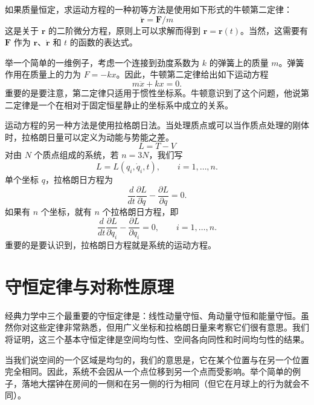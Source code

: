 如果质量恒定，求运动方程的一种初等方法是使用如下形式的牛顿第二定律：
\begin{equation}\label{eq:1.newton}
\ddot{\mathbf{r}} = \mathbf{F}/m
\end{equation}
这是关于 $\mathbf{r}$ 的二阶微分方程，原则上可以求解而得到 $\mathbf{r} = \mathbf{r}(t)$。当然，这需要有 $\mathbf{F}$ 作为 $\mathbf{r}$、$\dot{\mathbf{r}}$ 和 $t$ 的函数的表达式。

举一个简单的一维例子，考虑一个连接到劲度系数为 $k$ 的弹簧上的质量 $m$。弹簧作用在质量上的力为 $F = -kx$。因此，牛顿第二定律给出如下运动方程
\begin{equation}\label{eq:1.spring}
m\ddot{x} + kx = 0.
\end{equation}
重要的是要注意，第二定律只适用于惯性坐标系。牛顿意识到了这个问题，他说第二定律是一个在相对于固定恒星静止的坐标系中成立的关系。

运动方程的另一种方法是使用拉格朗日法。当处理质点或可以当作质点处理的刚体时，拉格朗日量可以定义为动能与势能之差。
\begin{equation}\label{eq:1.LTV}
L = T - V
\end{equation}
对由 $N$ 个质点组成的系统，若 $n = 3N$，我们写
\begin{equation}\label{eq:1.L}
L = L(q_i, \dot{q}_i, t), \qquad i = 1, \ldots, n.
\end{equation}
单个坐标 $q$，拉格朗日方程为
\begin{equation}\label{eq:1.lag}
\frac{d}{dt}\frac{\partial L}{\partial \dot{q}} - \frac{\partial L}{\partial q} = 0.
\end{equation}
如果有 $n$ 个坐标，就有 $n$ 个拉格朗日方程，即
\begin{equation}\label{eq:1.lagN}
\frac{d}{dt}\frac{\partial L}{\partial \dot{q}_i} - \frac{\partial L}{\partial q_i} = 0, \qquad i = 1, \ldots, n.
\end{equation}
重要的是要认识到，拉格朗日方程就是系统的运动方程。

\section{守恒定律与对称性原理}
经典力学中三个最重要的守恒定律是：线性动量守恒、角动量守恒和能量守恒。虽然你对这些定律非常熟悉，但用广义坐标和拉格朗日量来考察它们很有意思。我们将证明，这三个基本守恒定律是空间均匀性、空间各向同性和时间均匀性的结果。

当我们说空间的一个区域是均匀的，我们的意思是，它在某个位置与在另一个位置完全相同。因此，系统不会因从一个点位移到另一个点而受影响。举个简单的例子，落地大摆钟在房间的一侧和在另一侧的行为相同（但它在月球上的行为就会不同）。

